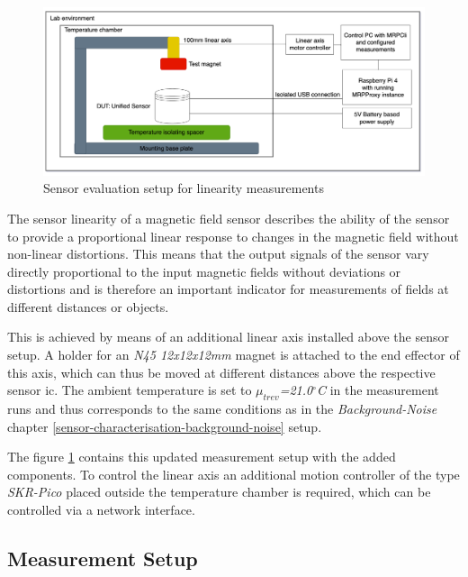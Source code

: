 \begin{figure}
\centering
\includegraphics{./generated_images/border_Sensor_evaluation_setup_for_linearity_measurements.png}
\caption{Sensor evaluation setup for linearity measurements
\label{Sensor_evaluation_setup_for_linearity_measurements.png}}
\end{figure}

The sensor linearity of a magnetic field sensor describes the ability of
the sensor to provide a proportional linear response to changes in the
magnetic field without non-linear distortions. This means that the
output signals of the sensor vary directly proportional to the input
magnetic fields without deviations or distortions and is therefore an
important indicator for measurements of fields at different distances or
objects.

This is achieved by means of an additional linear axis installed above
the sensor setup. A holder for an \emph{N45 12x12x12mm} magnet is
attached to the end effector of this axis, which can thus be moved at
different distances above the respective sensor \gls{ic}. The ambient
temperature is set to \emph{\(\mu_{trev}\)=21.0\(^{\circ}\)C} in the
measurement runs and thus corresponds to the same conditions as in the
\emph{Background-Noise} chapter
\ref{sensor-characterisation-background-noise} setup.

The figure \ref{Sensor_evaluation_setup_for_linearity_measurements.png}
contains this updated measurement setup with the added components. To
control the linear axis an additional motion controller of the type
\emph{SKR-Pico} placed outside the temperature chamber is required,
which can be controlled via a network interface.

\hypertarget{measurement-setup}{%
\subsection{Measurement Setup}\label{measurement-setup}}


